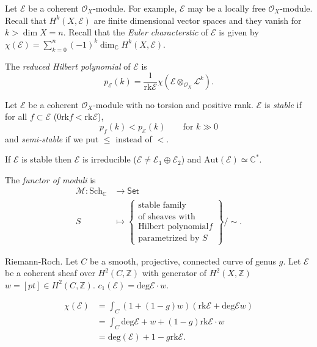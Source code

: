 \documentclass{book}
\begin{document}
Let $\mathcal{E}$ be a coherent
$\mathcal{O}_X$-module.
For example, $\mathcal{E}$ may be a locally
free $\mathcal{O}_X$-module.
Recall that $H^k(X,\mathcal{E})$ are finite
dimensional vector spaces
and they vanish for $k>\dim X=n$.
Recall that the {\it Euler characterstic} of
$\mathcal{E}$
is given by
$\chi(\mathcal{E})=\sum_{k=0}^n(-1)
^k\dim_{\mathbb{C}}H^k(X,\mathcal{E})$.

The {\it reduced Hilbert polynomial} of
$\mathcal{E}$ is
$$
p_{\mathcal{E}}(k)=\frac{1}{\text{rk}
\mathcal{E}}
\chi(\mathcal{E}\otimes_{\mathcal{O}_X}
\mathcal{L}^k).
$$

\begin{definition}
\label{definition-stable-module}
Let $\mathcal{E}$ be a coherent
$\mathcal{O}_X$-module
with no torsion and positive rank.
$\mathcal{E}$ is {\it stable} if for all $f
\subset \mathcal{E}$
($0 \text{rk} f<\text{rk}\mathcal{E}$),
$$
p_f(k)<p_{\mathcal{E}}(k)\qquad \text{for }
k\gg 0
$$
and {\it semi-stable} if we put $\leq$
instead of $<$.

\begin{lemma}
\label{lemma-stable}
If $\mathcal{E}$ is stable then $\mathcal{E}$
is irreducible
($\mathcal{E} \neq  \mathcal{E}_1 \oplus
\mathcal{E}_2$)
and $\text{Aut}(\mathcal{E})\simeq
\mathbb{C}^*$.
\end{lemma}

\end{definition}

The {\it functor of moduli} is
$$
\begin{aligned}
\mathcal{M}: \text{Sch}_\mathbb{C}
&\longrightarrow \mathsf{Set} \\
S
&\longmapsto
\left\{
\substack{\text{stable family}  \\ \text{of
sheaves with} \\
\text{Hilbert polynomial} f\\
\text{parametrized by $S$}}
\right\}\Big/\sim.
\end{aligned}
$$

\medskip\noindent
Riemann-Roch.
Let $C$ be a smooth, projective, connected
curve
of genus $g$.
Let $\mathcal{E}$ be a coherent sheaf over
$H^2(C,\mathbb{Z})$
with generator of $H^2(X,\mathbb{Z})$
$w=[pt] \in H^2(C,\mathbb{Z})$.
$c_1(\mathcal{E})=\text{deg}\mathcal{E}\cdot
w$.

\begin{theorem}
\label{theorem-euler-characteristic-moduli}
$$
\begin{aligned}
\chi(\mathcal{E})
&=\int_C(1+(1-g)w)(\text{rk}\mathcal{E}+
\text{deg}\mathcal{E}w)\\
&=\int_C
\text{deg}\mathcal{E}+w+(1-g)\text{rk}
\mathcal{E}\cdot
w\\
&=\text{deg}(\mathcal{E})+1-g
\text{rk}\mathcal{E}.
\end{aligned}
$$
\end{theorem}
\end{document}
